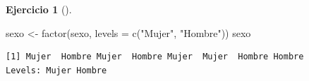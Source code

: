 \documentclass[
  spanish,
  a4paper,
]{scrreport}
\newenvironment{Shaded}{\begin{snugshade}}{\end{snugshade}}
\newcommand{\AttributeTok}[1]{\textcolor[rgb]{0.40,0.45,0.13}{#1}}
\newcommand{\FunctionTok}[1]{\textcolor[rgb]{0.28,0.35,0.67}{#1}}
\newcommand{\NormalTok}[1]{\textcolor[rgb]{0.00,0.23,0.31}{#1}}
\newcommand{\OtherTok}[1]{\textcolor[rgb]{0.00,0.23,0.31}{#1}}
\newcommand{\StringTok}[1]{\textcolor[rgb]{0.13,0.47,0.30}{#1}}
\theoremstyle{definition}
\newtheorem{exercise}{Ejercicio}[chapter]
\theoremstyle{remark}
\begin{document}
\begin{exercise}[]
\begin{enumerate}
\begin{tcolorbox}
\begin{Shaded}
\begin{Highlighting}[]
\NormalTok{sexo }\OtherTok{\textless{}{-}} \FunctionTok{factor}\NormalTok{(sexo, }\AttributeTok{levels =} \FunctionTok{c}\NormalTok{(}\StringTok{"Mujer"}\NormalTok{, }\StringTok{"Hombre"}\NormalTok{))}
\NormalTok{sexo}
\end{Highlighting}
\end{Shaded}

\begin{verbatim}
[1] Mujer  Hombre Mujer  Hombre Mujer  Mujer  Hombre Hombre
Levels: Mujer Hombre
\end{verbatim}

  \end{tcolorbox}
\end{enumerate}

\end{exercise}
\end{document}
